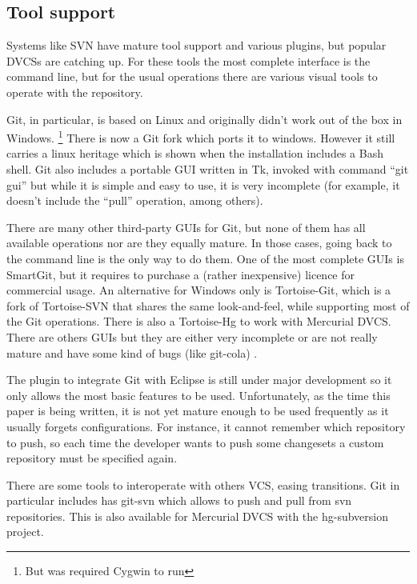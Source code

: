 \documentclass[a4paper,10pt]{article}
\begin{document}
\subsection{Tool support}

Systems like SVN have mature tool support and various plugins, but popular DVCSs are catching up.
For these tools the most complete interface is the command line, but for the usual operations
there are various visual tools to operate with the repository.

Git, in particular, is based on Linux and originally didn't work out of the box in Windows. \footnote{But was required Cygwin to run}
There is now a Git fork which ports it to windows. However it still carries a linux heritage which is shown when the installation includes a Bash shell.
Git also includes a portable GUI written in Tk, invoked with command ``git gui'' 
but while it is simple and easy to use, it is very incomplete (for example, 
it doesn't include the ``pull'' operation, among others).

There are many other third-party GUIs for Git, but none of them has all available operations nor are they equally mature. 
In those cases, going back to the command line is the only way to do them. One of the most complete GUIs is SmartGit, but 
it requires to purchase a (rather inexpensive) licence for commercial usage. An alternative for Windows only 
is Tortoise-Git, which is a fork of Tortoise-SVN that shares the same look-and-feel, while supporting most of the 
Git operations. There is also a Tortoise-Hg to work with Mercurial DVCS.
There are others GUIs but they are either very incomplete or are not really mature and have 
some kind of bugs (like git-cola) \cite{interfaces}.

The plugin to integrate Git with Eclipse is still under major development so it only allows the most basic features to be used.
Unfortunately, as the time this paper is being written, it is not yet mature enough to be used frequently as it usually forgets configurations. For instance, it cannot remember which repository to push, so each time the developer wants to push some changesets a custom repository must be specified again.

There are some tools to interoperate with others VCS, easing transitions.
Git in particular includes has git-svn which allows to push and pull from svn repositories. This is also available for Mercurial DVCS
with the hg-subversion project.
\end{document}
